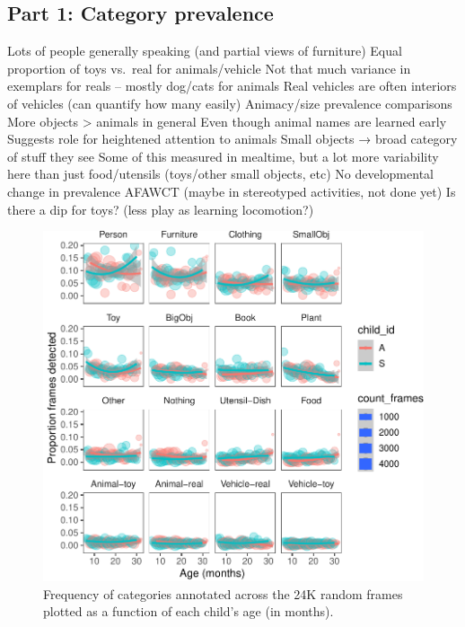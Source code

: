 \documentclass[10pt, letterpaper]{article}
\newenvironment{CodeChunk}{}{}
\begin{document}
\subsection{Part 1: Category
prevalence}\label{part-1-category-prevalence}

Lots of people generally speaking (and partial views of furniture) Equal
proportion of toys vs.~real for animals/vehicle Not that much variance
in exemplars for reals -- mostly dog/cats for animals Real vehicles are
often interiors of vehicles (can quantify how many easily) Animacy/size
prevalence comparisons More objects \textgreater{} animals in general
Even though animal names are learned early Suggests role for heightened
attention to animals Small objects → broad category of stuff they see
Some of this measured in mealtime, but a lot more variability here than
just food/utensils (toys/other small objects, etc) No developmental
change in prevalence AFAWCT (maybe in stereotyped activities, not done
yet) Is there a dip for toys? (less play as learning locomotion?)

\begin{CodeChunk}
\begin{figure}[h]

{\centering \includegraphics{figs/freq_by_category-1} 

}

\caption[Frequency of categories annotated across the 24K random frames plotted as a function of each child's age (in months)]{Frequency of categories annotated across the 24K random frames plotted as a function of each child's age (in months).}\label{fig:freq_by_category}
\end{figure}
\end{CodeChunk}
\end{document}
